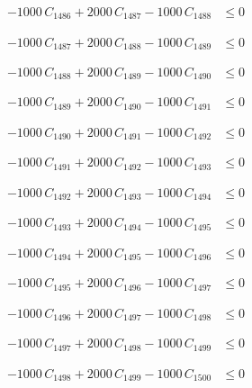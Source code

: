 \documentclass[a4paper,11pt]{article}
\begin{document}
\begin{align}
-1000\,C_{1486} + 2000\,C_{1487} - 1000\,C_{1488} &\leq 0 \nonumber
\end{align}

\begin{align}
-1000\,C_{1487} + 2000\,C_{1488} - 1000\,C_{1489} &\leq 0 \nonumber
\end{align}

\begin{align}
-1000\,C_{1488} + 2000\,C_{1489} - 1000\,C_{1490} &\leq 0 \nonumber
\end{align}

\begin{align}
-1000\,C_{1489} + 2000\,C_{1490} - 1000\,C_{1491} &\leq 0 \nonumber
\end{align}

\begin{align}
-1000\,C_{1490} + 2000\,C_{1491} - 1000\,C_{1492} &\leq 0 \nonumber
\end{align}

\begin{align}
-1000\,C_{1491} + 2000\,C_{1492} - 1000\,C_{1493} &\leq 0 \nonumber
\end{align}

\begin{align}
-1000\,C_{1492} + 2000\,C_{1493} - 1000\,C_{1494} &\leq 0 \nonumber
\end{align}

\begin{align}
-1000\,C_{1493} + 2000\,C_{1494} - 1000\,C_{1495} &\leq 0 \nonumber
\end{align}

\begin{align}
-1000\,C_{1494} + 2000\,C_{1495} - 1000\,C_{1496} &\leq 0 \nonumber
\end{align}

\begin{align}
-1000\,C_{1495} + 2000\,C_{1496} - 1000\,C_{1497} &\leq 0 \nonumber
\end{align}

\begin{align}
-1000\,C_{1496} + 2000\,C_{1497} - 1000\,C_{1498} &\leq 0 \nonumber
\end{align}

\begin{align}
-1000\,C_{1497} + 2000\,C_{1498} - 1000\,C_{1499} &\leq 0 \nonumber
\end{align}

\begin{align}
-1000\,C_{1498} + 2000\,C_{1499} - 1000\,C_{1500} &\leq 0 \nonumber
\end{align}
\end{document}
